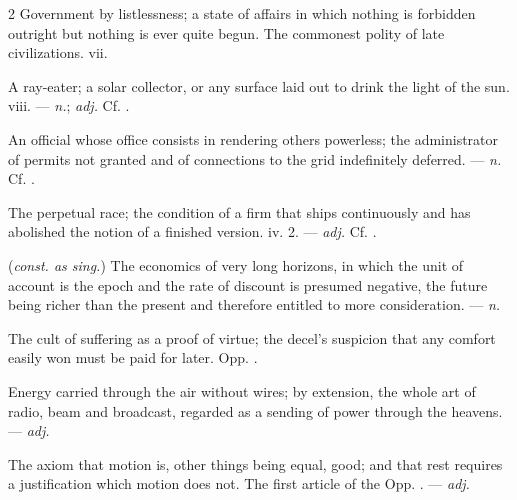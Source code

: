 \begin{multicols}{2}
 Government by listlessness; a state of affairs in which nothing is forbidden outright but nothing is ever quite begun. The commonest polity of late civilizations.   vii.

 A ray-eater; a solar collector, or any surface laid out to drink the light of the sun.   viii. —  \textit{n.};  \textit{adj.} Cf. .

 An official whose office consists in rendering others powerless; the administrator of permits not granted and of connections to the grid indefinitely deferred. —  \textit{n.} Cf. .

 The perpetual race; the condition of a firm that ships continuously and has abolished the notion of a finished version.   iv. 2. —  \textit{adj.} Cf. .

 (\textit{const. as sing.}) The economics of very long horizons, in which the unit of account is the epoch and the rate of discount is presumed negative, the future being richer than the present and therefore entitled to more consideration. —  \textit{n.}

  The cult of suffering as a proof of virtue; the decel's suspicion that any comfort easily won must be paid for later. Opp. .

 Energy carried through the air without wires; by extension, the whole art of radio, beam and broadcast, regarded as a sending of power through the heavens. —  \textit{adj.}

 The axiom that motion is, other things being equal, good; and that rest requires a justification which motion does not. The first article of the  Opp. . —  \textit{adj.}


\end{multicols}
